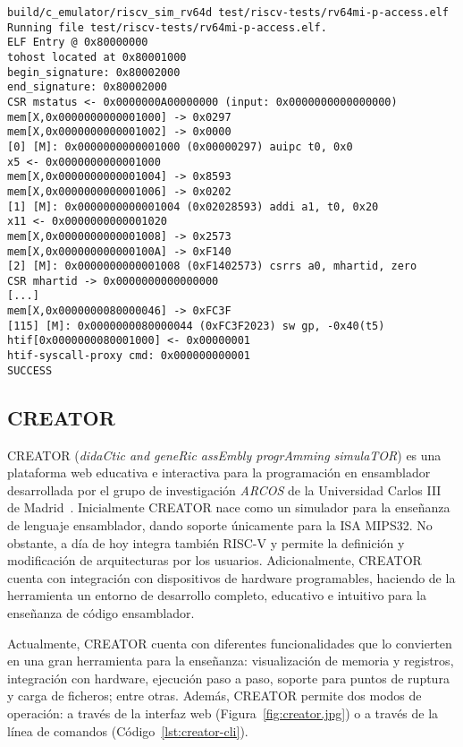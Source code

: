\begin{lstlisting}[caption=Ejecución del simulador sail-riscv, label={lstl:sail}]
build/c_emulator/riscv_sim_rv64d test/riscv-tests/rv64mi-p-access.elf
Running file test/riscv-tests/rv64mi-p-access.elf.
ELF Entry @ 0x80000000
tohost located at 0x80001000
begin_signature: 0x80002000
end_signature: 0x80002000
CSR mstatus <- 0x0000000A00000000 (input: 0x0000000000000000)
mem[X,0x0000000000001000] -> 0x0297
mem[X,0x0000000000001002] -> 0x0000
[0] [M]: 0x0000000000001000 (0x00000297) auipc t0, 0x0
x5 <- 0x0000000000001000
mem[X,0x0000000000001004] -> 0x8593
mem[X,0x0000000000001006] -> 0x0202
[1] [M]: 0x0000000000001004 (0x02028593) addi a1, t0, 0x20
x11 <- 0x0000000000001020
mem[X,0x0000000000001008] -> 0x2573
mem[X,0x000000000000100A] -> 0xF140
[2] [M]: 0x0000000000001008 (0xF1402573) csrrs a0, mhartid, zero
CSR mhartid -> 0x0000000000000000
[...]
mem[X,0x0000000080000046] -> 0xFC3F
[115] [M]: 0x0000000080000044 (0xFC3F2023) sw gp, -0x40(t5)
htif[0x0000000080001000] <- 0x00000001
htif-syscall-proxy cmd: 0x000000000001
SUCCESS
\end{lstlisting}

\subsection{CREATOR}

CREATOR (\textit{didaCtic and geneRic assEmbly progrAmming simulaTOR}) es una
plataforma web educativa e interactiva para la programación en
ensamblador desarrollada por el grupo de investigación \textit{ARCOS} de la
Universidad Carlos III de Madrid~\cite{camarmas2024creator}. Inicialmente
CREATOR nace como un
simulador para la enseñanza de lenguaje ensamblador, dando soporte únicamente
para la ISA MIPS32. No obstante, a día de hoy integra también RISC-V y permite
la definición y modificación de arquitecturas por los usuarios. Adicionalmente,
CREATOR cuenta con integración con dispositivos de hardware programables, haciendo de
la herramienta un entorno de desarrollo completo, educativo e intuitivo para la enseñanza
de código ensamblador.

Actualmente, CREATOR cuenta con diferentes funcionalidades que lo convierten en
una gran herramienta para la enseñanza: visualización de memoria y registros,
integración con hardware, ejecución paso a paso, soporte para puntos de ruptura
y carga de ficheros; entre otras. Además, CREATOR permite dos modos de
operación: a través de la interfaz web (Figura~\ref{fig:creator.jpg}) o a
través de la línea de comandos (Código~\ref{lst:creator-cli}).

